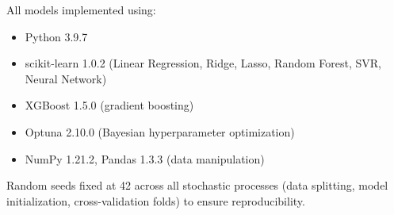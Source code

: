 All models implemented using:
\begin{itemize}
    \item Python 3.9.7
    \item scikit-learn 1.0.2 (Linear Regression, Ridge, Lasso, Random Forest, SVR, Neural Network)
    \item XGBoost 1.5.0 (gradient boosting)
    \item Optuna 2.10.0 (Bayesian hyperparameter optimization)
    \item NumPy 1.21.2, Pandas 1.3.3 (data manipulation)
\end{itemize}

Random seeds fixed at 42 across all stochastic processes (data splitting, model initialization, cross-validation folds) to ensure reproducibility.

\clearpage
